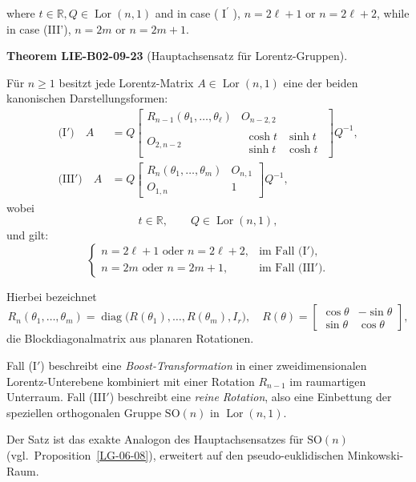 \documentclass[10pt, letterpaper]{article}
\newcommand{\CustomHeading}[3]{%
  \par\medskip\noindent%
  \textbf{#1 #2} \textnormal{(#3)}.\enskip%
}
\newenvironment{THEO}[2]{\begin{unitbox}\CustomHeading{Theorem}{#1}{#2}}{\end{unitbox}}
\begin{document}
where $t \in \mathbb{R}, Q \in \operatorname{Lor}(n, 1)$ and in case ( $\mathrm{I}^{\prime}$ ), $n=2 \ell+1$ or $n=2 \ell+2$, while in case (III'), $n=2 m$ or $n=2 m+1$.



\begin{THEO}{LIE-B02-09-23}{Hauptachsensatz für Lorentz-Gruppen}
Für \(n \ge 1\) besitzt jede Lorentz-Matrix
\(A \in \operatorname{Lor}(n,1)\)
eine der beiden kanonischen Darstellungsformen:
\[
\begin{aligned}
\text{(I$'$)}\quad
A
&=
Q
\begin{bmatrix}
R_{n-1}(\theta_{1},\ldots,\theta_{\ell}) & O_{n-2,2}\\[4pt]
O_{2,n-2} &
\begin{array}{cc}
\cosh t & \sinh t\\[2pt]
\sinh t & \cosh t
\end{array}
\end{bmatrix}
Q^{-1},\\[10pt]
\text{(III$'$)}\quad
A
&=
Q
\begin{bmatrix}
R_{n}(\theta_{1},\ldots,\theta_{m}) & O_{n,1}\\[4pt]
O_{1,n} & 1
\end{bmatrix}
Q^{-1},
\end{aligned}
\]
wobei
\[
t \in \mathbb{R}, \qquad
Q \in \operatorname{Lor}(n,1),
\]
und gilt:
\[
\begin{cases}
n = 2\ell + 1 \text{ oder } n = 2\ell + 2, & \text{im Fall (I$'$)},\\[4pt]
n = 2m \text{ oder } n = 2m + 1, & \text{im Fall (III$'$)}.
\end{cases}
\]

Hierbei bezeichnet
\[
R_{n}(\theta_{1},\ldots,\theta_{m})
=
\operatorname{diag}\big(R(\theta_{1}),\ldots,R(\theta_{m}),I_{r}\big),
\quad
R(\theta)=
\begin{bmatrix}
\cos\theta & -\sin\theta\\[2pt]
\sin\theta & \cos\theta
\end{bmatrix},
\]
die Blockdiagonalmatrix aus planaren Rotationen.


Fall (I$'$) beschreibt eine \emph{Boost-Transformation} in einer zweidimensionalen Lorentz-Unterebene
kombiniert mit einer Rotation \(R_{n-1}\) im raumartigen Unterraum.  
Fall (III$'$) beschreibt eine \emph{reine Rotation}, also eine Einbettung der
speziellen orthogonalen Gruppe \(\mathrm{SO}(n)\) in \(\operatorname{Lor}(n,1)\).

Der Satz ist das exakte Analogon des Hauptachsensatzes für
\(\mathrm{SO}(n)\) (vgl.~Proposition~\ref{LG-06-08}), erweitert auf den
pseudo-euklidischen Minkowski-Raum.
\end{THEO}
\end{document}
